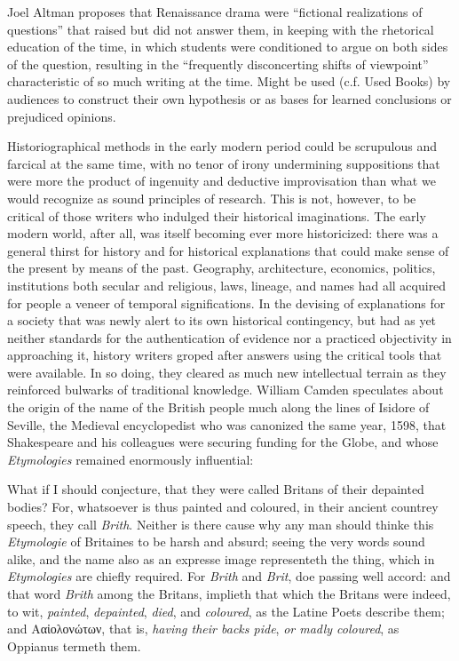 Joel Altman proposes that Renaissance drama were ``fictional realizations of questions'' that raised but did not answer them, in keeping with the rhetorical education of the time, in which students were conditioned to argue on both sides of the question, resulting in the ``frequently disconcerting shifts of viewpoint'' characteristic of so much writing at the time. Might be used (c.f. Used Books) by audiences to construct their own hypothesis or as bases for learned conclusions or prejudiced opinions.~\cite[3]{altman_tudor_1978}

Historiographical methods in the early modern period could be scrupulous and farcical at the same time, with no tenor of irony undermining suppositions that were more the product of ingenuity and deductive improvisation than what we would recognize as sound principles of research. This is not, however, to be critical of those writers who indulged their historical imaginations. The early modern world, after all, was itself becoming ever more historicized: there was a general thirst for history and for historical explanations that could make sense of the present by means of the past. Geography, architecture, economics, politics, institutions both secular and religious, laws, lineage, and names had all acquired for people a veneer of temporal significations. In the devising of explanations for a society that was newly alert to its own historical contingency, but had as yet neither standards for the authentication of evidence nor a practiced objectivity in approaching it, history writers groped after answers using the critical tools that were available. In so doing, they cleared as much new intellectual terrain as they reinforced bulwarks of traditional knowledge. William Camden speculates about the origin of the name of the British people much along the lines of Isidore of Seville, the Medieval encyclopedist who was canonized the same year, 1598, that Shakespeare and his colleagues were securing funding for the Globe, and whose \emph{Etymologies} remained enormously influential:
\begin{bq}
What if I should conjecture, that they were called Britans of their depainted bodies? For, whatsoever is thus painted and coloured, in their ancient countrey speech, they call \emph{Brith}. Neither is there cause why any man should thinke this \emph{Etymologie} of Britaines to be harsh and absurd; seeing the very words sound alike, and the name also as an expresse image representeth the thing, which in \emph{Etymologies} are chiefly required. For \emph{Brith} and \emph{Brit}, doe passing well accord: and that word \emph{Brith} among the Britans, implieth that which the Britans were indeed, to wit, \emph{painted}, \emph{depainted}, \emph{died}, and \emph{coloured}, as the Latine Poets describe them; and Aαἰολονώτων, that is, \emph{having their backs pide}, \emph{or madly coloured}, as Oppianus termeth them.~\cite[26]{camden_britain_1637}
\end{bq}
